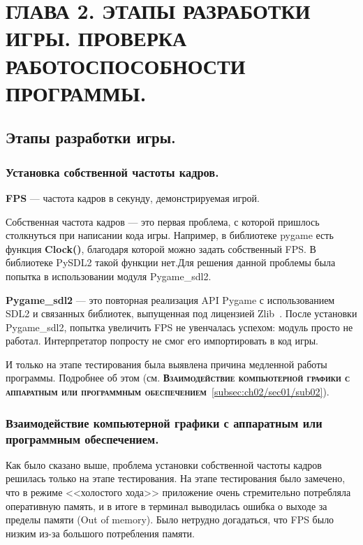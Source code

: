 \chapter{\label{ch:ch02}ГЛАВА 2. ЭТАПЫ РАЗРАБОТКИ ИГРЫ. ПРОВЕРКА РАБОТОСПОСОБНОСТИ ПРОГРАММЫ.}

\section{\label{sec:ch02/sec01}Этапы разработки игры.}

\subsection{\label{subsec:ch02/sec01/sub01}Установка собственной частоты кадров.}
\textbf{FPS} --- частота кадров в секунду, демонстрируемая игрой.

Собственная частота кадров --- это первая проблема, с которой пришлось столкнуться при написании кода игры. Например, в библиотеке pygame есть функция \textbf{Clock()},
благодаря которой можно задать собственный FPS. В библиотеке PySDL2 такой функции нет.Для решения данной проблемы была попытка в использовании модуля Pygame\_sdl2.

\textbf{Pygame\_sdl2} --- это повторная реализация API Pygame с использованием SDL2 и связанных библиотек, выпущенная под лицензией Zlib~\cite{pgsdl2EN}.
После установки Pygame\_sdl2, попытка увеличить FPS не увенчалась успехом: модуль просто не работал. Интерпретатор попросту не смог его импортировать в код игры.

И только на этапе тестирования была выявлена причина медленной работы программы. 
Подробнее об этом (см. \textbf{\textsc{Взаимодействие компьютерной графики с аппаратным или программным обеспечением}}~\ref{subsec:ch02/sec01/sub02}).

\subsection{\label{subsec:ch02/sec01/sub02}Взаимодействие компьютерной графики с аппаратным или программным обеспечением.}
Как было сказано выше, проблема установки собственной частоты кадров решилась только на этапе тестирования. На этапе тестирования было замечено, что в режиме <<холостого хода>>
приложение очень стремительно потребляла оперативную память, и в итоге в терминал выводилась ошибка о выходе за пределы памяти (Out of memory). Было нетрудно догадаться,
что FPS было низким из-за большого потребления памяти.

